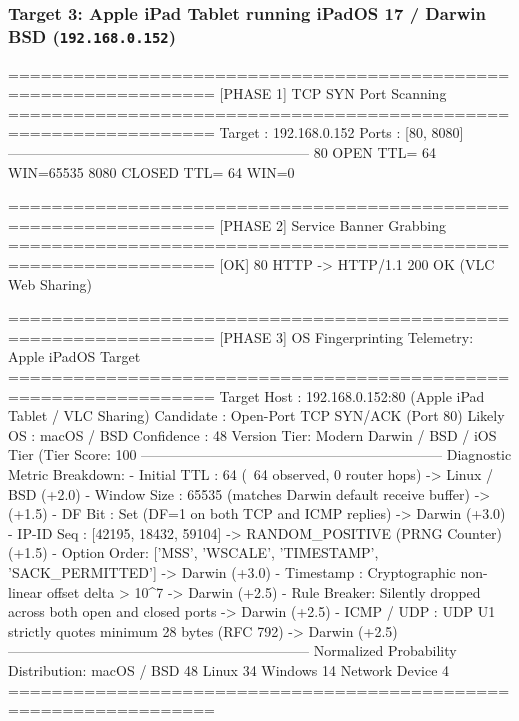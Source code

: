 \subsubsection{Target 3: Apple iPad Tablet running iPadOS 17 / Darwin BSD (\texttt{192.168.0.152})}
\begin{logbox}
=================================================================
  [PHASE 1] TCP SYN Port Scanning
=================================================================
  Target      : 192.168.0.152
  Ports       : [80, 8080]
-----------------------------------------------------------------
     80  OPEN                           TTL= 64 WIN=65535
   8080  CLOSED                         TTL= 64 WIN=0

=================================================================
  [PHASE 2] Service Banner Grabbing
=================================================================
  [OK]   80  HTTP     -> HTTP/1.1 200 OK (VLC Web Sharing)

=================================================================
  [PHASE 3] OS Fingerprinting Telemetry: Apple iPadOS Target
=================================================================
  Target Host : 192.168.0.152:80 (Apple iPad Tablet / VLC Sharing)
  Candidate   : Open-Port TCP SYN/ACK (Port 80)
  Likely OS   : macOS / BSD             Confidence : 48%
  Version Tier: Modern Darwin / BSD / iOS Tier (Tier Score: 100%
-----------------------------------------------------------------
  Diagnostic Metric Breakdown:
    - Initial TTL : 64 (~64 observed, 0 router hops) -> Linux / BSD (+2.0)
    - Window Size : 65535 (matches Darwin default receive buffer) -> (+1.5)
    - DF Bit      : Set (DF=1 on both TCP and ICMP replies) -> Darwin (+3.0)
    - IP-ID Seq   : [42195, 18432, 59104] -> RANDOM_POSITIVE (PRNG Counter) (+1.5)
    - Option Order: ['MSS', 'WSCALE', 'TIMESTAMP', 'SACK_PERMITTED'] -> Darwin (+3.0)
    - Timestamp   : Cryptographic non-linear offset delta > 10^7 -> Darwin (+2.5)
    - Rule Breaker: Silently dropped across both open and closed ports -> Darwin (+2.5)
    - ICMP / UDP  : UDP U1 strictly quotes minimum 28 bytes (RFC 792) -> Darwin (+2.5)
-----------------------------------------------------------------
  Normalized Probability Distribution:
    macOS / BSD       48%
    Linux             34%
    Windows           14%
    Network Device     4%
=================================================================
\end{logbox}

